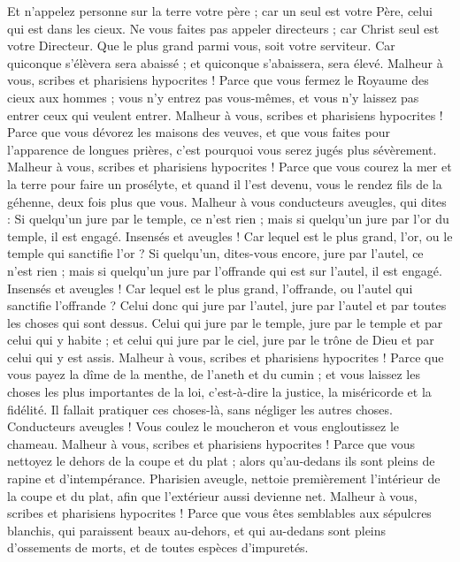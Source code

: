 \begin{multicols}{2}
Et n'appelez personne sur la terre votre père ; car un seul est votre Père, celui qui est dans les cieux.
Ne vous faites pas appeler directeurs ; car Christ seul est votre Directeur.
Que le plus grand parmi vous, soit votre serviteur.
Car quiconque s'élèvera sera abaissé ; et quiconque s'abaissera, sera élevé.
Malheur à vous, scribes et pharisiens hypocrites ! Parce que vous fermez le Royaume des cieux aux hommes ; vous n'y entrez pas vous-mêmes, et vous n’y laissez pas entrer ceux qui veulent entrer.
Malheur à vous, scribes et pharisiens hypocrites ! Parce que vous dévorez les maisons des veuves, et que vous faites pour l’apparence de longues prières, c'est pourquoi vous serez jugés plus sévèrement.
Malheur à vous, scribes et pharisiens hypocrites ! Parce que vous courez la mer et la terre pour faire un prosélyte, et quand il l'est devenu, vous le rendez fils de la géhenne, deux fois plus que vous.
Malheur à vous conducteurs aveugles, qui dites : Si quelqu’un jure par le temple, ce n'est rien ; mais si quelqu’un jure par l'or du temple, il est engagé.
Insensés et aveugles ! Car lequel est le plus grand, l'or, ou le temple qui sanctifie l'or ?
Si quelqu’un, dites-vous encore, jure par l'autel, ce n'est rien ; mais si quelqu’un jure par l’offrande qui est sur l'autel, il est engagé.
Insensés et aveugles ! Car lequel est le plus grand, l’offrande, ou l'autel qui sanctifie l’offrande ?
Celui donc qui jure par l'autel, jure par l'autel et par toutes les choses qui sont dessus.
Celui qui jure par le temple, jure par le temple et par celui qui y habite ;
et celui qui jure par le ciel, jure par le trône de Dieu et par celui qui y est assis.
Malheur à vous, scribes et pharisiens hypocrites ! Parce que vous payez la dîme{} de la menthe, de l'aneth et du cumin ; et vous laissez les choses les plus importantes de la loi, c'est-à-dire la justice, la miséricorde et la fidélité. Il fallait pratiquer ces choses-là, sans négliger les autres choses.
Conducteurs aveugles ! Vous coulez le moucheron et vous engloutissez le chameau{}.
Malheur à vous, scribes et pharisiens hypocrites ! Parce que vous nettoyez le dehors de la coupe et du plat ; alors qu’au-dedans ils sont pleins de rapine et d'intempérance.
Pharisien aveugle, nettoie premièrement l’intérieur de la coupe et du plat, afin que l’extérieur aussi devienne net.
Malheur à vous, scribes et pharisiens hypocrites ! Parce que vous êtes semblables aux sépulcres blanchis, qui paraissent beaux au-dehors, et qui au-dedans sont pleins d'ossements de morts, et de toutes espèces d’impuretés.

\end{multicols}
